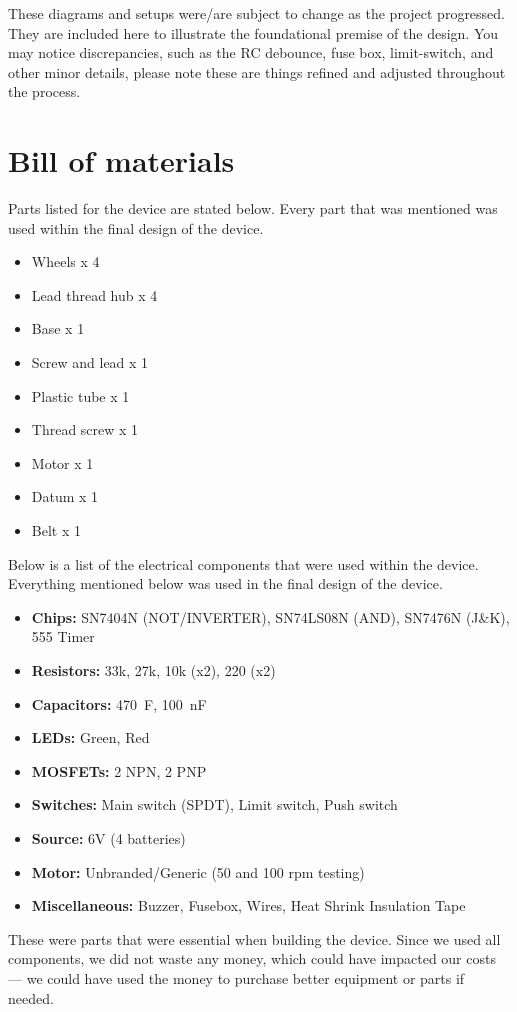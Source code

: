 \documentclass{article}
\begin{document}
These diagrams and setups were/are subject to change as the project progressed. They are included here to illustrate the foundational premise of the design. You may notice discrepancies, such as the RC debounce, fuse box, limit-switch, and other minor details, please note these are things refined and adjusted throughout the process.

\newpage\restoregeometry

\section{Bill of materials}
Parts listed for the device are stated below. Every part that was mentioned was used within the final design of the device.
\begin{itemize}[itemsep=-1mm]
	\item Wheels x 4
	\item Lead thread hub x 4
	\item Base x 1
	\item Screw and lead x 1
	\item Plastic tube x 1
	\item Thread screw x 1
	\item Motor x 1
	\item Datum x 1
	\item Belt x 1
\end{itemize}\noindent
Below is a list of the electrical components that were used within the device. Everything mentioned below was used in the final design of the device.
\begin{itemize}[itemsep=-1mm]
	\item \textbf{Chips:} SN7404N (NOT/INVERTER), SN74LS08N (AND), SN7476N (J\&K), 555 Timer
	\item \textbf{Resistors:} 33k, 27k, 10k (x2), 220 (x2)
	\item \textbf{Capacitors:} 470~\textmu F, 100~nF
	\item \textbf{LEDs:} Green, Red
	\item \textbf{MOSFETs:} 2 NPN, 2 PNP
	\item \textbf{Switches:} Main switch (SPDT), Limit switch, Push switch
	\item \textbf{Source:} 6V (4 batteries)
	\item \textbf{Motor:} Unbranded/Generic (50 and 100 rpm testing)
	\item \textbf{Miscellaneous:} Buzzer, Fusebox, Wires, Heat Shrink Insulation Tape
\end{itemize}
These were parts that were essential when building the device. Since we used all components, we did not waste any money, which could have impacted our costs — we could have used the money to purchase better equipment or parts if needed.
\end{document}
